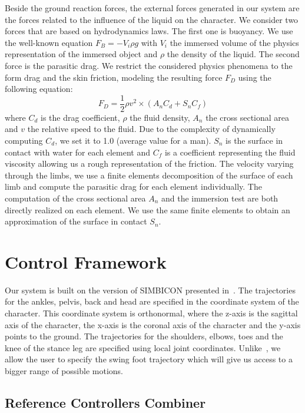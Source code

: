 \documentclass[runningheads,a4paper,10pt]{llncs}
\begin{document}
Beside the ground reaction forces, the external forces generated in our system are the forces related to the influence of the liquid on the character. We consider two forces that are based on hydrodynamics laws. The first one is buoyancy. We use the well-known equation $F_{B}=-V_i \rho g$ with $V_i$ the immersed volume of the physics representation of the immersed object and $\rho$ the density of the liquid. The second force is the parasitic drag. We restrict the considered physics phenomena to the form drag and the skin friction, modeling the resulting force $F_D$ using the following equation:
\begin{equation}
F_D=\frac{1}{2} \rho v^2 \times (A_n C_d + S_n C_f)
\end{equation}
where $C_d$ is the drag coefficient, $\rho$ the fluid density, $A_n$ the cross sectional area and $v$ the relative speed to the fluid. Due to the complexity of dynamically computing $C_d$, we set it to 1.0 (average value for a man). $S_n$ is the surface in contact with water for each element and $C_f$ is a coefficient representing the fluid viscosity allowing us a rough representation of the friction. The velocity varying through the limbs, we use a finite elements decomposition of the surface of each limb and compute the parasitic drag for each element individually. The computation of the cross sectional area $A_n$ and the immersion test are both directly realized on each element. We use the same finite elements to obtain an approximation of the surface in contact $S_n$.

\section{Control Framework}
\label{sec:control_framework}

Our system is built on the version of SIMBICON presented in~\citep{coros2010generalized}. The trajectories for the ankles, pelvis, back and head are specified in the coordinate system of the character. This coordinate system is orthonormal, where the z-axis is the sagittal axis of the character, the x-axis is the coronal axis of the character and the y-axis points to the ground. The trajectories for the shoulders, elbows, toes and the knee of the stance leg are specified using local joint coordinates. Unlike~\citep{coros2010generalized}, we allow the user to specify the swing foot trajectory which will give us access to a bigger range of possible motions. 


\subsection{Reference Controllers Combiner}
\label{sec:multi_state}
\end{document}
